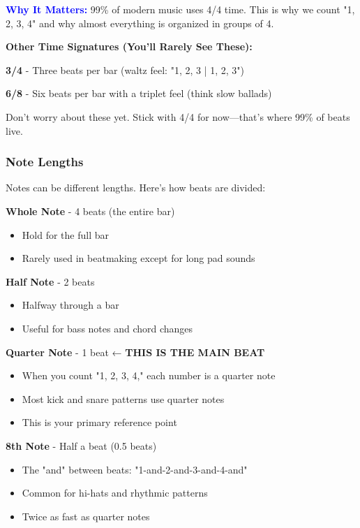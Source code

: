 \documentclass[11pt,letterpaper]{article}
\newcommand{\bluepurple}[1]{\textcolor{blue}{\textbf{#1}}}
\begin{document}
\textbf{\bluepurple{Why It Matters:}} 99\% of modern music uses 4/4 time. This is why we count "1, 2, 3, 4" and why almost everything is organized in groups of 4.

\begin{tcolorbox}[colback=lightgray,colframe=darkgray,width=\textwidth,arc=3mm,boxrule=1pt]
\textbf{Other Time Signatures (You'll Rarely See These):}

\textbf{3/4} - Three beats per bar (waltz feel: "1, 2, 3 | 1, 2, 3")

\textbf{6/8} - Six beats per bar with a triplet feel (think slow ballads)

Don't worry about these yet. Stick with 4/4 for now—that's where 99\% of beats live.
\end{tcolorbox}

\subsubsection{Note Lengths}

Notes can be different lengths. Here's how beats are divided:

\textbf{Whole Note} - 4 beats (the entire bar)
\begin{itemize}[leftmargin=*]
\item Hold for the full bar
\item Rarely used in beatmaking except for long pad sounds
\end{itemize}

\textbf{Half Note} - 2 beats
\begin{itemize}[leftmargin=*]
\item Halfway through a bar
\item Useful for bass notes and chord changes
\end{itemize}

\textbf{Quarter Note} - 1 beat ← \textbf{THIS IS THE MAIN BEAT}
\begin{itemize}[leftmargin=*]
\item When you count "1, 2, 3, 4," each number is a quarter note
\item Most kick and snare patterns use quarter notes
\item This is your primary reference point
\end{itemize}

\textbf{8th Note} - Half a beat (0.5 beats)
\begin{itemize}[leftmargin=*]
\item The "and" between beats: "1-and-2-and-3-and-4-and"
\item Common for hi-hats and rhythmic patterns
\item Twice as fast as quarter notes
\end{itemize}
\end{document}
